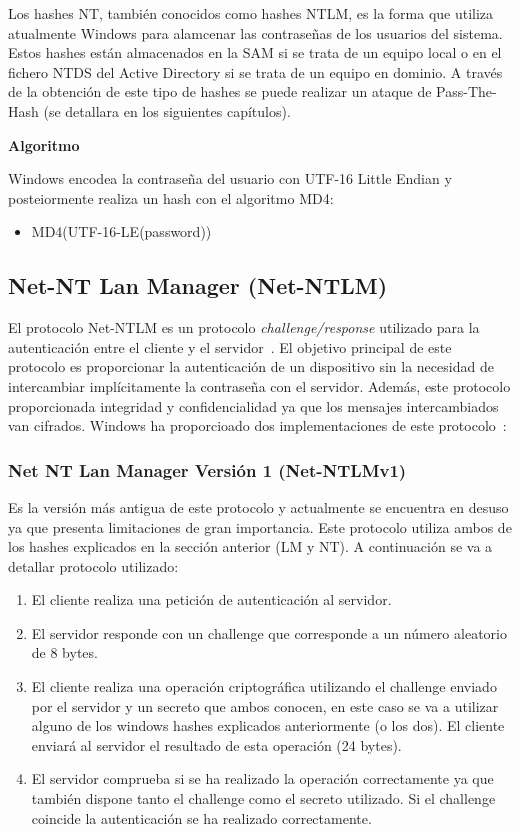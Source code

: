 Los hashes NT, también conocidos como hashes NTLM, es la forma que utiliza atualmente Windows para alamcenar las contraseñas de los usuarios del sistema. Estos hashes están almacenados en la SAM si se trata de un equipo local o en el fichero NTDS del Active Directory si se trata de un equipo en dominio. A través de la obtención de este tipo de hashes se puede realizar un ataque de Pass-The-Hash (se detallara en los siguientes capítulos).

\textbf{Algoritmo}

Windows encodea la contraseña del usuario con UTF-16 Little Endian y posteiormente realiza un hash con el algoritmo MD4: 

\begin{itemize}
\item MD4(UTF-16-LE(password))
\end{itemize}

\subsection{Net-NT Lan Manager (Net-NTLM)}

El protocolo Net-NTLM es un protocolo {\it challenge/response} utilizado para la autenticación entre el cliente y el servidor~\cite{Capitulo3:NTLM2}. El objetivo principal de este protocolo es proporcionar la autenticación de un dispositivo sin la necesidad de intercambiar implícitamente la contraseña con el servidor. Además, este protocolo proporcionada integridad y confidencialidad ya que los mensajes intercambiados van cifrados. Windows ha proporcioado dos implementaciones de este protocolo~\cite{Capitulo3:NTLANManager}:

\subsubsection{Net NT Lan Manager Versión 1 (Net-NTLMv1)}

Es la versión más antigua de este protocolo y actualmente se encuentra en desuso ya que presenta limitaciones de gran importancia. Este protocolo utiliza ambos de los hashes explicados en la sección anterior (LM y NT). A continuación se va a detallar protocolo utilizado:

\begin{enumerate}
\item El cliente realiza una petición de autenticación al servidor.
\item El servidor responde con un challenge que corresponde a un número aleatorio de 8 bytes. 
\item El cliente realiza una operación criptográfica utilizando el challenge enviado por el servidor y un secreto que ambos conocen, en este caso se va a utilizar alguno de los windows hashes explicados anteriormente (o los dos). El cliente enviará al servidor el resultado de esta operación (24 bytes). 
\item El servidor comprueba si se ha realizado la operación correctamente ya que también dispone tanto el challenge como el secreto utilizado. Si el challenge coincide la autenticación se ha realizado correctamente. 
\end{enumerate}

